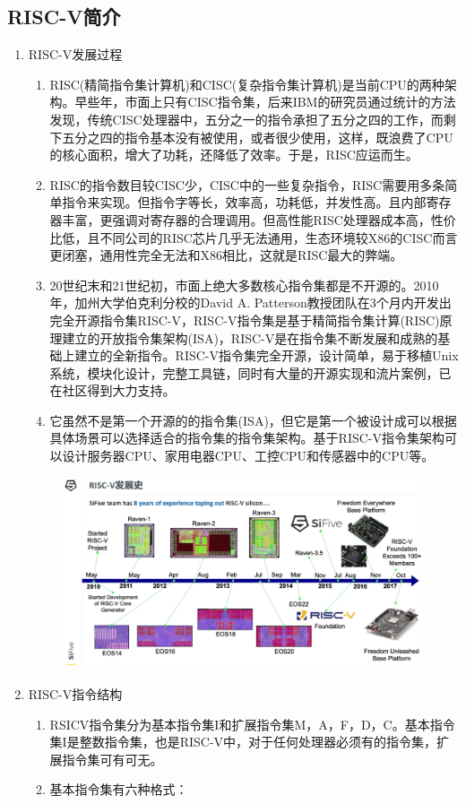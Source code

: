 \documentclass[a4paper, 14pt, oneside]{book} %
\numberwithin{equation}{subsection}
\begin{document}
	\subsection{RISC-V简介}
	\begin{enumerate}
		\item{RISC-V发展过程}
		\begin{enumerate}
			\item 
				RISC(精简指令集计算机)和CISC(复杂指令集计算机)是当前CPU的两种架构。早些年，市面上只有CISC指令集，后来IBM的研究员通过统计的方法发现，传统CISC处理器中，五分之一的指令承担了五分之四的工作，而剩下五分之四的指令基本没有被使用，或者很少使用，这样，既浪费了CPU的核心面积，增大了功耗，还降低了效率。于是，RISC应运而生。
			\item
				RISC的指令数目较CISC少，CISC中的一些复杂指令，RISC需要用多条简单指令来实现。但指令字等长，效率高，功耗低，并发性高。且内部寄存器丰富，更强调对寄存器的合理调用。但高性能RISC处理器成本高，性价比低，且不同公司的RISC芯片几乎无法通用，生态环境较X86的CISC而言更闭塞，通用性完全无法和X86相比，这就是RISC最大的弊端。
			\item
				20世纪末和21世纪初，市面上绝大多数核心指令集都是不开源的。2010年，加州大学伯克利分校的David A. Patterson教授团队在3个月内开发出完全开源指令集RISC-V，RISC-V指令集是基于精简指令集计算(RISC)原理建立的开放指令集架构(ISA)，RISC-V是在指令集不断发展和成熟的基础上建立的全新指令。RISC-V指令集完全开源，设计简单，易于移植Unix系统，模块化设计，完整工具链，同时有大量的开源实现和流片案例，已在社区得到大力支持。
			\item
				它虽然不是第一个开源的的指令集(ISA)，但它是第一个被设计成可以根据具体场景可以选择适合的指令集的指令集架构。基于RISC-V指令集架构可以设计服务器CPU、家用电器CPU、工控CPU和传感器中的CPU等。
		\end{enumerate}
		\begin{figure}[!htbp]
			\centering
			\includegraphics[scale=0.8]{img/one.png}
		\end{figure}
		\item{RISC-V指令结构}
		\begin{enumerate}
			\item 
				RSICV指令集分为基本指令集I和扩展指令集M，A，F，D，C。基本指令集I是整数指令集，也是RISC-V中，对于任何处理器必须有的指令集，扩展指令集可有可无。
			\item
				{基本指令集有六种格式：}
			\begin{enumerate}
				

\end{enumerate}
\end{enumerate}
\end{enumerate}
\end{document}
